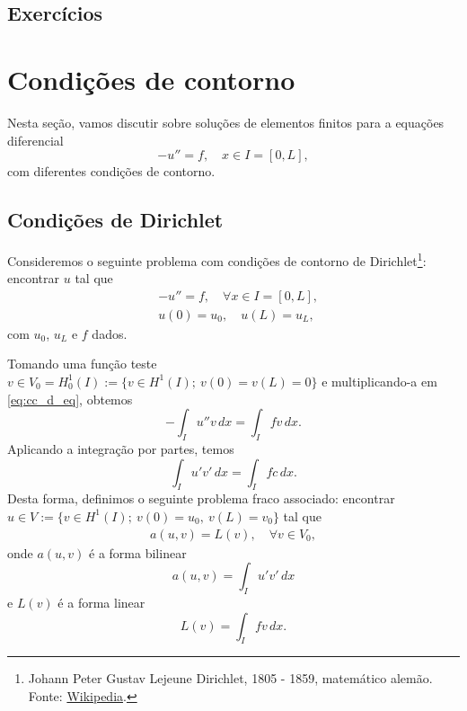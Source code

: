 \subsection*{Exercícios}

\emconstrucao


\section{Condições de contorno}\label{cap_mef1d_sec_cc}

Nesta seção, vamos discutir sobre soluções de elementos finitos para a equações diferencial
\begin{equation}
  -u'' = f,\quad x\in I=[0, L],
\end{equation}
com diferentes condições de contorno.

\subsection{Condições de Dirichlet}

Consideremos o seguinte problema com condições de contorno de Dirichlet\footnote{Johann Peter Gustav Lejeune Dirichlet, 1805 - 1859, matemático alemão. Fonte: \href{https://en.wikipedia.org/wiki/Peter_Gustav_Lejeune_Dirichlet}{Wikipedia}.}: encontrar $u$ tal que
\begin{align}
  &-u'' = f,\quad \forall x\in I=[0, L],\label{eq:cc_d_eq}\\
  &u(0) = u_0,\quad u(L) = u_L,\label{eq:cc_d_bc}
\end{align}
com $u_0$, $u_L$ e $f$ dados.

Tomando uma função teste $v\in V_0=H^1_0(I):=\{v\in H^1(I);~v(0)=v(L)=0\}$ e multiplicando-a em \eqref{eq:cc_d_eq}, obtemos
\begin{equation}
  - \int_I u''v\,dx = \int_I fv\,dx.
\end{equation}
Aplicando a integração por partes, temos
\begin{equation}
  \int_I u'v'\,dx = \int_I fc\,dx.
\end{equation}
Desta forma, definimos o seguinte problema fraco associado: encontrar $u\in V := \{v\in H^1(I);~v(0)=u_0,~v(L)=v_0\}$ tal que
\begin{align}
  a(u,v) = L(v),\quad\forall v\in V_0,
\end{align}
onde $a(u,v)$ é a forma bilinear
\begin{equation}
  a(u,v) = \int_I u'v'\,dx
\end{equation}
e $L(v)$ é a forma linear
\begin{equation}
  L(v) = \int_I fv\,dx.
\end{equation}


